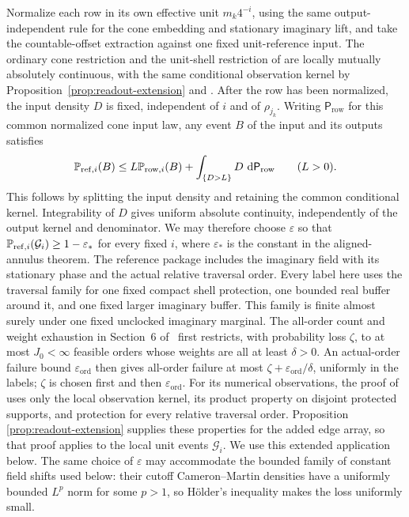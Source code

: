 Normalize each row in its own effective unit \(m_k4^{-i}\), using the same
output-independent rule for the cone embedding and stationary imaginary
lift, and take the countable-offset extraction against one fixed
unit-reference input.  The ordinary cone restriction and the unit-shell
restriction of \cite[Theorem~6.4]{C} are locally mutually absolutely continuous,
with the same conditional observation kernel by
Proposition~\ref{prop:readout-extension} and
\cite[Proposition~5.12]{C}.  After the row has been normalized, the input
density \(D\) is fixed, independent of \(i\) and of \(\rho_{j_k}\).
Writing \(\mathsf P_{\mathrm{row}}\) for this common normalized cone input
law, any event \(B\) of the input and its outputs satisfies
\[
 \mathbb P_{\mathrm{ref},i}(B)
 \le L\mathbb P_{\mathrm{row},i}(B)
      +\int_{\{D>L\}}D\,\,\mathrm d\mathsf P_{\mathrm{row}}
 \qquad(L>0).
\]
This follows by splitting the input density and retaining the common
conditional kernel.  Integrability of \(D\) gives uniform absolute
continuity, independently of the output kernel and denominator.  We may therefore
choose \(\varepsilon\) so that
\(\mathbb P_{\mathrm{ref},i}(\mathcal G_i)\ge1-\varepsilon_*\) for every fixed
\(i\), where \(\varepsilon_*\) is the constant in the aligned-annulus
theorem.  The reference package includes
the imaginary field with its stationary phase and the actual relative
traversal order.  Every label here uses the traversal family for one fixed
compact shell protection, one bounded real buffer around it, and one fixed
larger imaginary buffer.  This family is finite almost surely under one
fixed unclocked imaginary marginal.  The all-order count and weight
exhaustion in Section~6 of~\cite{C} first restricts, with probability loss
\(\zeta\), to at most \(J_0<\infty\) feasible orders whose weights are all
at least \(\delta>0\).  An actual-order failure bound
\(\varepsilon_{\mathrm{ord}}\) then gives all-order failure at most
\(\zeta+\varepsilon_{\mathrm{ord}}/\delta\), uniformly in the labels;
\(\zeta\) is chosen first and then \(\varepsilon_{\mathrm{ord}}\).
For its numerical observations, the proof of
\cite[Theorem~6.4]{C} uses only the local observation kernel, its product
property on disjoint protected supports, and protection for every relative
traversal order.  Proposition
\ref{prop:readout-extension} supplies these properties for the added
edge array, so that proof applies to the local unit events
\(\mathcal G_i\).  We use this extended application below.
The same choice of \(\varepsilon\) may accommodate the
bounded family of constant field shifts used below: their cutoff
Cameron--Martin densities have a uniformly bounded \(L^p\) norm for some
\(p>1\), so Hölder's inequality makes the loss uniformly small.

